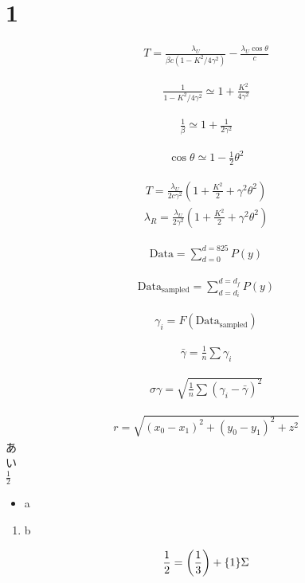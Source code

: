 \documentclass[a4paper,11pt,uplatex]{jsarticle}
\begin{document}
\tableofcontents
\clearpage


\title{}
\author{}
\date{\today}
\maketitle
\section{1}

\begin{eqnarray}
  T = \frac{\lambda_U}{\beta c (1- K^2/4\gamma^2)}  - \frac{\lambda_U \cos \theta}{c}
\end{eqnarray}

\begin{eqnarray}
  \frac{1}{1-K^2/4\gamma^2} \simeq 1 + \frac{K^2}{4\gamma^2} 
\end{eqnarray}

\begin{eqnarray}
  \frac{1}{\beta} \simeq 1 + \frac{1}{2\gamma^2}
\end{eqnarray}

\begin{eqnarray}
  \cos \theta  \simeq 1 - \frac{1}{2} \theta^2
\end{eqnarray}


\begin{eqnarray}
  T = \frac{\lambda_U}{2c\gamma^2} \left( 1 + \frac{K^2}{2} + \gamma^2\theta^2\right)
\end{eqnarray}
\begin{eqnarray}
  \lambda_R =\frac{\lambda_U}{2\gamma^2} \left( 1 + \frac{K^2}{2} + \gamma^2\theta^2\right) 
\end{eqnarray}

\begin{eqnarray}
  \text{Data} = \sum_{d =0}^{d  = 825} P(y)
\end{eqnarray}

\begin{eqnarray}
  \text{Data}_{\text{sampled}} = \sum_{d = d_i}^{d = d_f} P(y)
\end{eqnarray}

\begin{eqnarray}
  \gamma_i = F(\text{Data}_{\text{sampled}})
\end{eqnarray}

\begin{eqnarray}
  \bar{\gamma}  = \frac{1}{n}\sum \gamma_i 
\end{eqnarray}

\begin{eqnarray}
  \sigma \gamma = \sqrt{ \frac{1}{n}\sum (\gamma_i - \bar{\gamma})^2 }
\end{eqnarray}

\begin{eqnarray}
  r = \sqrt{(x_0-x_1)^2 + (y_0 - y_1)^2 + z^2}
\end{eqnarray}
あ\\
い\\
$\frac{1}{2}$

\begin{itemize}
  \item a
\end{itemize}
\begin{enumerate}
  \item b
\end{enumerate}
\begin{align}
\frac{1}{2} = \qty(\frac{1}{3}) + \qty{1}\Sigma
\end{align}
\end{document}
